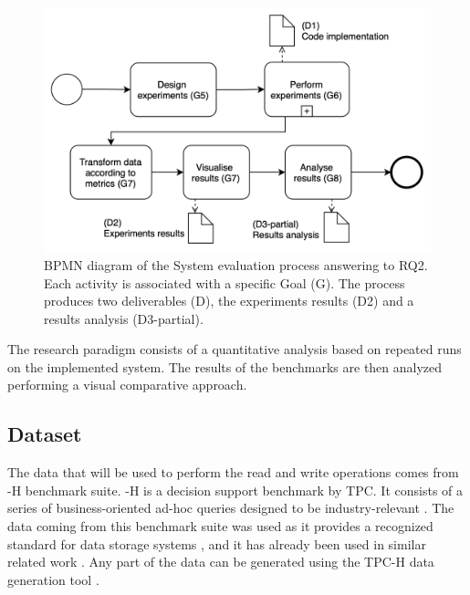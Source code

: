 \begin{figure}[!ht]
    \begin{center}
      \includegraphics[width=\textwidth]{figures/3-method/research_process_rq2.png}
    \caption{\gls{BPMN} diagram of the System evaluation process answering to RQ2. Each activity is associated with a specific Goal (\gls{G}). The process produces two deliverables (\gls{D}), the experiments results (D2) and a results analysis (D3-partial).}
    \label{fig:DevProcessRQ2}
    \end{center}
\end{figure}

The research paradigm consists of a quantitative analysis based on repeated runs on the implemented system. The results of the benchmarks are then analyzed performing a visual comparative approach.

\subsection{Dataset}
\label{subsec:dataset}

The data that will be used to perform the read and write operations comes from -H benchmark suite\cite{TPCHHomepage}. -H is a decision support benchmark by \gls{TPC}. It consists of a series of business-oriented ad-hoc queries designed to be industry-relevant \cite{transactionprocessingperformancecounciltpcTPCH_v301pdf1993}. The data coming from this benchmark suite was used as
it provides a recognized standard for data storage systems \cite{TPC_benchmarks_2000}, and it has already been used in similar related work \cite{raasveldtDuckDBEmbeddableAnalytical2019, behmPhotonFastQuery2022}. Any part of the data can be generated using the TPC-H data generation tool \cite{TPCCurrentSpecs}.

